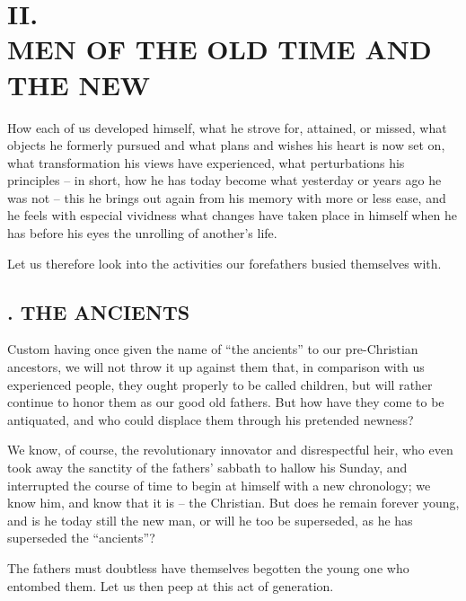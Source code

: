 \chapter[II. Men Of The Old And The New]{\centering II.\\
MEN OF THE OLD TIME AND THE NEW}

\medskip{}

\noindent{}How each of us developed himself, what he strove for, attained, or 
missed, what objects he formerly pursued and what plans and wishes his heart 
is now set on, what transformation his views have experienced, what 
perturbations his principles -- in short, how he has today become what 
yesterday or years ago he was not -- this he brings out again from his memory 
with more or less ease, and he feels with especial vividness what changes have 
taken place in himself when he has before his eyes the unrolling of another's 
life.

Let us therefore look into the activities our forefathers busied themselves 
with.

\medskip{}

\section[1. The Ancients]{. THE ANCIENTS}

Custom having once given the name of ``the ancients'' to our pre-Christian 
ancestors, we will not throw it up against them that, in comparison with us 
experienced people, they ought properly to be called children, but will rather 
continue to honor them as our good old fathers. But how have they come to be 
antiquated, and who could displace them through his pretended newness?

We know, of course, the revolutionary innovator and disrespectful heir, who 
even took away the sanctity of the fathers' sabbath to hallow his Sunday, and 
interrupted the course of time to begin at himself with a new chronology; we 
know him, and know that it is -- the Christian. But does he remain forever 
young, and is he today still the new man, or will he too be superseded, as he 
has superseded the ``ancients''?

The fathers must doubtless have themselves begotten the young one who entombed 
them. Let us then peep at this act of generation.

